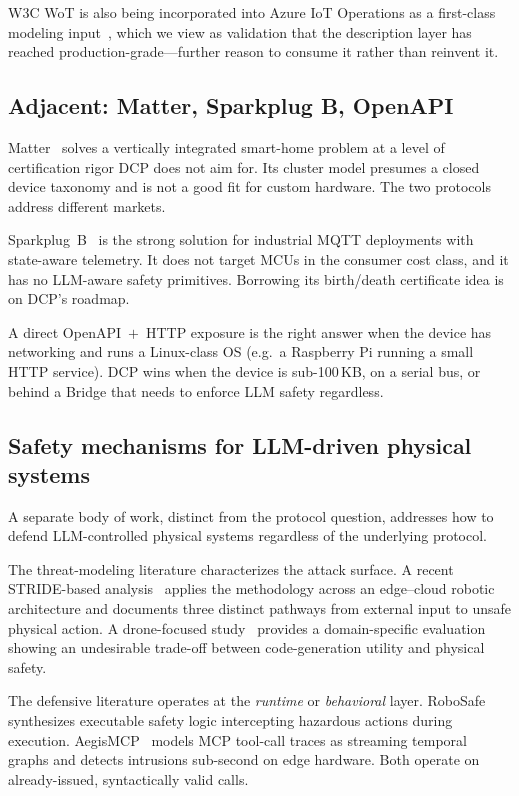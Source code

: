 \documentclass[11pt,a4paper]{article}
\begin{document}
W3C WoT is also being incorporated into Azure IoT Operations as a
first-class modeling input~\cite{azure_wot_2025}, which we view as
validation that the description layer has reached
production-grade---further reason to consume it rather than reinvent it.

\subsection{Adjacent: Matter, Sparkplug B, OpenAPI}

Matter~\cite{matter_spec} solves a vertically integrated smart-home
problem at a level of certification rigor DCP does not aim for. Its
cluster model presumes a closed device taxonomy and is not a good fit for
custom hardware. The two protocols address different markets.

Sparkplug~B~\cite{sparkplug} is the strong solution for industrial MQTT
deployments with state-aware telemetry. It does not target MCUs in the
consumer cost class, and it has no LLM-aware safety primitives. Borrowing
its birth/death certificate idea is on DCP's roadmap.

A direct OpenAPI~$+$~HTTP exposure is the right answer when the device has
networking and runs a Linux-class OS (e.g.\ a Raspberry Pi running a small
HTTP service). DCP wins when the device is sub-100\,KB, on a serial bus,
or behind a Bridge that needs to enforce LLM safety regardless.

\subsection{Safety mechanisms for LLM-driven physical systems}

A separate body of work, distinct from the protocol question, addresses
how to defend LLM-controlled physical systems regardless of the underlying
protocol.

The threat-modeling literature characterizes the attack surface. A recent
STRIDE-based analysis~\cite{prompt_to_actuation} applies the methodology
across an edge--cloud robotic architecture and documents three distinct
pathways from external input to unsafe physical action. A drone-focused
study~\cite{physical_safety_llm} provides a domain-specific evaluation
showing an undesirable trade-off between code-generation utility and
physical safety.

The defensive literature operates at the \emph{runtime} or
\emph{behavioral} layer. RoboSafe~\cite{robosafe} synthesizes executable
safety logic intercepting hazardous actions during execution.
AegisMCP~\cite{aegismcp} models MCP tool-call traces as streaming
temporal graphs and detects intrusions sub-second on edge hardware. Both
operate on already-issued, syntactically valid calls.
\end{document}
